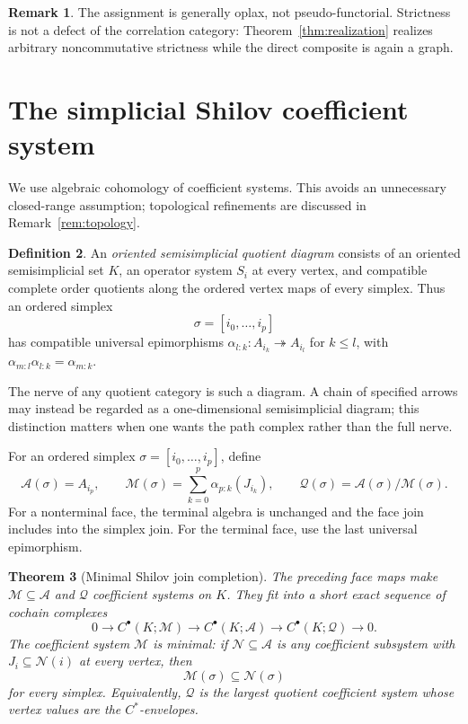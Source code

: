 \documentclass[11pt,a4paper]{amsart}
\theoremstyle{plain}
\newtheorem{theorem}{Theorem}[section]
\theoremstyle{definition}
\newtheorem{definition}[theorem]{Definition}
\newtheorem{remark}[theorem]{Remark}
\begin{document}
\begin{remark}
The assignment is generally oplax, not pseudo-functorial.  Strictness is not a defect of the
correlation category: Theorem~\ref{thm:realization} realizes arbitrary noncommutative strictness
while the direct composite is again a graph.
\end{remark}

\section{The simplicial Shilov coefficient system}\label{sec:cohomology}

We use algebraic cohomology of coefficient systems.  This avoids an unnecessary closed-range
assumption; topological refinements are discussed in Remark~\ref{rem:topology}.

\begin{definition}
An \emph{oriented semisimplicial quotient diagram} consists of an oriented semisimplicial set $K$,
an operator system $S_i$ at every vertex, and compatible complete order quotients along the
ordered vertex maps of every simplex.  Thus an ordered simplex
\[
 \sigma=[i_0,\ldots,i_p]
\]
has compatible universal epimorphisms
\(\alpha_{l:k}:A_{i_k}\twoheadrightarrow A_{i_l}\) for $k\leq l$, with
\(\alpha_{m:l}\alpha_{l:k}=\alpha_{m:k}\).
\end{definition}

The nerve of any quotient category is such a diagram.  A chain of specified arrows may instead
be regarded as a one-dimensional semisimplicial diagram; this distinction matters when one wants
the path complex rather than the full nerve.

For an ordered simplex $\sigma=[i_0,\ldots,i_p]$, define
\[
 \mathcal A(\sigma)=A_{i_p},\qquad
 \mathcal M(\sigma)=\sum_{k=0}^p\alpha_{p:k}(J_{i_k}),\qquad
 \mathcal Q(\sigma)=\mathcal A(\sigma)/\mathcal M(\sigma).
\]
For a nonterminal face, the terminal algebra is unchanged and the face join includes into the
simplex join.  For the terminal face, use the last universal epimorphism.

\begin{theorem}[Minimal Shilov join completion]\label{thm:joincompletion}
The preceding face maps make $\mathcal M\subseteq\mathcal A$ and $\mathcal Q$ coefficient
systems on $K$.  They fit into a short exact sequence of cochain complexes
\[
 0\longrightarrow C^\bullet(K;\mathcal M)
 \longrightarrow C^\bullet(K;\mathcal A)
 \longrightarrow C^\bullet(K;\mathcal Q)\longrightarrow0.
\]
The coefficient system $\mathcal M$ is minimal: if
$\mathcal N\subseteq\mathcal A$ is any coefficient subsystem with
$J_i\subseteq\mathcal N(i)$ at every vertex, then
\[
 \mathcal M(\sigma)\subseteq\mathcal N(\sigma)
\]
for every simplex.  Equivalently, $\mathcal Q$ is the largest quotient coefficient system whose
vertex values are the $C^*$-envelopes.
\end{theorem}
\end{document}
